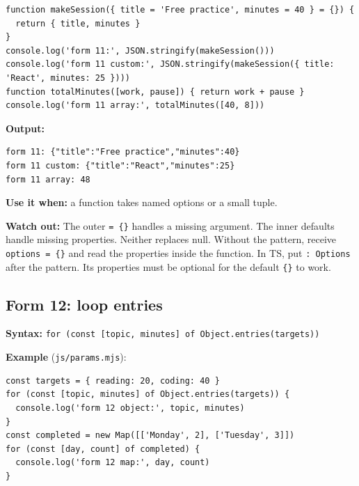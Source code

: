 \documentclass[
  10pt,
  a4paper,
]{article}
\begin{document}
\begin{minipage}{\linewidth}

\begin{lstlisting}
function makeSession({ title = 'Free practice', minutes = 40 } = {}) {
  return { title, minutes }
}
console.log('form 11:', JSON.stringify(makeSession()))
console.log('form 11 custom:', JSON.stringify(makeSession({ title: 'React', minutes: 25 })))
function totalMinutes([work, pause]) { return work + pause }
console.log('form 11 array:', totalMinutes([40, 8]))
\end{lstlisting}

\end{minipage}\par


\textbf{Output:}

\begin{minipage}{\linewidth}

\begin{lstlisting}
form 11: {"title":"Free practice","minutes":40}
form 11 custom: {"title":"React","minutes":25}
form 11 array: 48
\end{lstlisting}

\end{minipage}\par

\textbf{Use it when:} a function takes named options or a small tuple.

\textbf{Watch out:} The outer \texttt{= \{\}} handles a missing
argument. The inner defaults handle missing properties. Neither replaces
null. Without the pattern, receive \texttt{options = \{\}} and read the
properties inside the function. In TS, put
\texttt{:\allowbreak{} Options} after the pattern. Its properties must
be optional for the default \texttt{\{\}} to work.

\subsection{Form 12: loop entries}\label{form-12-loop-entries}

\textbf{Syntax:}
\texttt{for (const [topic, minutes] of Object.\allowbreak{}entries(targets))}

\textbf{Example} (\texttt{js/\allowbreak{}params.\allowbreak{}mjs}):

\begin{minipage}{\linewidth}

\begin{lstlisting}
const targets = { reading: 20, coding: 40 }
for (const [topic, minutes] of Object.entries(targets)) {
  console.log('form 12 object:', topic, minutes)
}
const completed = new Map([['Monday', 2], ['Tuesday', 3]])
for (const [day, count] of completed) {
  console.log('form 12 map:', day, count)
}
\end{lstlisting}

\end{minipage}\par
\end{document}
